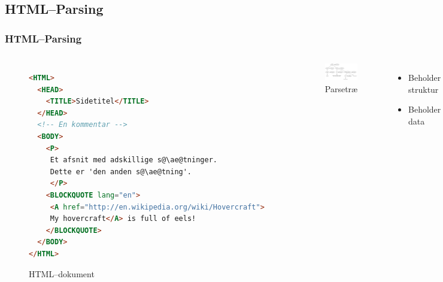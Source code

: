 \documentclass{beamer}
\begin{document}
\subsection{HTML--Parsing}
\begin{frame}[fragile]
  \frametitle{HTML--Parsing}

  \begin{columns}[t]
    \begin{figure}
\begin{lstlisting}[language=HTML, basicstyle=\tiny\ttfamily,
                   escapechar=\@]
<HTML>
  <HEAD>
    <TITLE>Sidetitel</TITLE>
  </HEAD>
  <!-- En kommentar -->
  <BODY>
    <P>
     Et afsnit med adskillige s@\ae@tninger.
     Dette er 'den anden s@\ae@tning'.
     </P>
    <BLOCKQUOTE lang="en">
     <A href="http://en.wikipedia.org/wiki/Hovercraft">
     My hovercraft</A> is full of eels!
    </BLOCKQUOTE>
  </BODY>
</HTML>
\end{lstlisting}

      \caption{HTML--dokument}
    \end{figure}

\pause

    \begin{figure}
      \includegraphics[width=\textwidth]{parsetree.pdf}
      \caption{Parsetræ}
    \end{figure}

    \begin{itemize}
    \item<1-> Beholder struktur
    \item<2-> Beholder data
    \end{itemize}
    
  \end{columns}

\end{frame}
\end{document}
